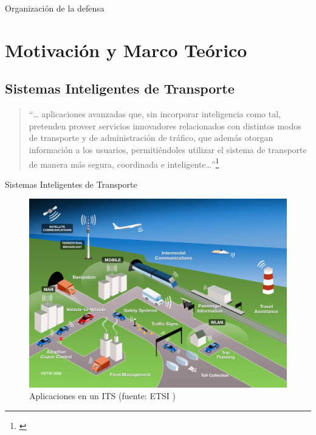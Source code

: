 \documentclass[aspectratio=169]{beamer}
\begin{document}
\begin{frame}{Organización de la defensa}
\tableofcontents
\end{frame}

\section{Motivación y Marco Teórico}
\subsection{Sistemas Inteligentes de Transporte}

\begin{frame}[standout]
\begin{quote}
    \centering
    
    ``\dots\@
    aplicaciones avanzadas que, sin incorporar inteligencia como tal, pretenden proveer servicios innovadores relacionados con distintos modos de transporte y de administración de tráfico, que además otorgan información a los usuarios, permitiéndoles utilizar el sistema de transporte de manera más segura, coordinada e inteligente\dots''\footnote{\textcite{eudirective}}
\end{quote}
\end{frame}

\begin{frame}{Sistemas Inteligentes de Transporte}
\begin{figure}
    \centering
    \includegraphics[height=0.8\textheight]{figuras/ITS.png}
    \caption{Aplicaciones en un ITS (fuente: ETSI \autocite{etsi})}
    \label{fig:itsetsi}
\end{figure}
\end{frame}
\end{document}

